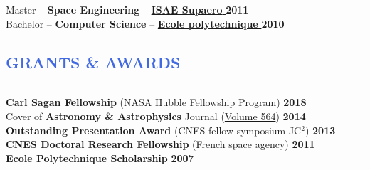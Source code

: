 \documentclass[12pt]{article}
\begin{document}
Master -- \textbf{Space Engineering} -- \href{https://www.isae-supaero.fr/en/}{\textbf{\textbf{ISAE Supaero} }} \hfill  { \bf 2011} \\

Bachelor -- \textbf{Computer Science} -- \href{http://www.polytechnique.edu/en/}{\textbf{\textbf{Ecole polytechnique} }}  \hfill    { \bf 2010 }\\






\vspace{-0.25cm}
\textcolor{RoyalBlue}{\section{\large GRANTS \& AWARDS}
\vspace{-0.45cm}\hrule}
\vspace{0.4cm}
\textbf{Carl Sagan Fellowship} (\href{http://www.stsci.edu/stsci-research/fellowships/nasa-hubble-fellowship-program}{NASA Hubble Fellowship Program}) \hfill   \textbf{2018}\\ %

Cover of \textbf{Astronomy \& Astrophysics} Journal (\href{https://www.aanda.org/articles/aa/abs/2014/04/contents/contents.html}{Volume 564}) \hfill  \textbf{2014}\\

\textbf{Outstanding Presentation Award} (CNES fellow symposium JC$^2$) \hfill   \textbf{2013}\\

\textbf{CNES Doctoral Research Fellowship} (\href{https://cnes.fr/en/web/CNES-en/7430-research-grants.php}{French space agency})  \hfill   \textbf{2011}\\ %

\textbf{Ecole Polytechnique Scholarship}   \hfill   \textbf{2007}\\
\end{document}
